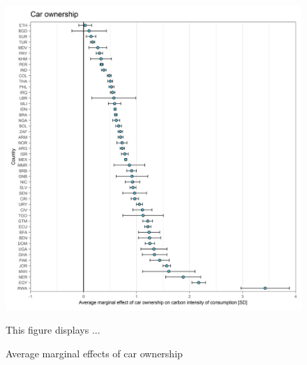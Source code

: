 \documentclass[12pt, a4paper]{article}
\newenvironment{subcaption}
{\strut
\vspace{-5pt}
\begin{minipage}[b]{0.9\textwidth}
  \hspace*{-\parindent}
  \footnotesize}
 {\end{minipage}}
\begin{document}
\begin{figure}[ht!]
  \centering
 \caption{Average marginal effects of car ownership} \label{fig:E1_Car}
  \includegraphics{Analysis_OLS_ME_Carbon_Intensity/AME_OLS_CI_car.01}
  \begin{subcaption}
    This figure displays ...
  \end{subcaption}

\end{figure}

\clearpage
\end{document}
